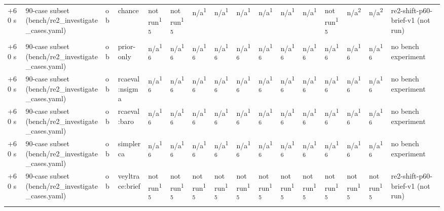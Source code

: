 \begin{table}[t]
\begin{tabular}{llllllllllllllll}
+60 s & 90-case subset (bench/re2\_investigate\_cases.yaml) & ob & chance & not run\textsuperscript{15} & not run\textsuperscript{15} & n/a\textsuperscript{1} & n/a\textsuperscript{1} & n/a\textsuperscript{1} & n/a\textsuperscript{1} & n/a\textsuperscript{1} & n/a\textsuperscript{1} & not run\textsuperscript{15} & n/a\textsuperscript{2} & n/a\textsuperscript{2} & re2-shift-p60-brief-v1 (not run) \\
+60 s & 90-case subset (bench/re2\_investigate\_cases.yaml) & ob & prior-only & n/a\textsuperscript{16} & n/a\textsuperscript{16} & n/a\textsuperscript{16} & n/a\textsuperscript{16} & n/a\textsuperscript{16} & n/a\textsuperscript{16} & n/a\textsuperscript{16} & n/a\textsuperscript{16} & n/a\textsuperscript{16} & n/a\textsuperscript{16} & n/a\textsuperscript{16} & no bench experiment \\
+60 s & 90-case subset (bench/re2\_investigate\_cases.yaml) & ob & rcaeval:nsigma & n/a\textsuperscript{16} & n/a\textsuperscript{16} & n/a\textsuperscript{16} & n/a\textsuperscript{16} & n/a\textsuperscript{16} & n/a\textsuperscript{16} & n/a\textsuperscript{16} & n/a\textsuperscript{16} & n/a\textsuperscript{16} & n/a\textsuperscript{16} & n/a\textsuperscript{16} & no bench experiment \\
+60 s & 90-case subset (bench/re2\_investigate\_cases.yaml) & ob & rcaeval:baro & n/a\textsuperscript{16} & n/a\textsuperscript{16} & n/a\textsuperscript{16} & n/a\textsuperscript{16} & n/a\textsuperscript{16} & n/a\textsuperscript{16} & n/a\textsuperscript{16} & n/a\textsuperscript{16} & n/a\textsuperscript{16} & n/a\textsuperscript{16} & n/a\textsuperscript{16} & no bench experiment \\
+60 s & 90-case subset (bench/re2\_investigate\_cases.yaml) & ob & simplerca & n/a\textsuperscript{16} & n/a\textsuperscript{16} & n/a\textsuperscript{16} & n/a\textsuperscript{16} & n/a\textsuperscript{16} & n/a\textsuperscript{16} & n/a\textsuperscript{16} & n/a\textsuperscript{16} & n/a\textsuperscript{16} & n/a\textsuperscript{16} & n/a\textsuperscript{16} & no bench experiment \\
+60 s & 90-case subset (bench/re2\_investigate\_cases.yaml) & ob & veyltrace:brief & not run\textsuperscript{15} & not run\textsuperscript{15} & not run\textsuperscript{15} & not run\textsuperscript{15} & not run\textsuperscript{15} & not run\textsuperscript{15} & not run\textsuperscript{15} & not run\textsuperscript{15} & not run\textsuperscript{15} & not run\textsuperscript{15} & not run\textsuperscript{15} & re2-shift-p60-brief-v1 (not run) \\

\end{tabular}
\end{table}
